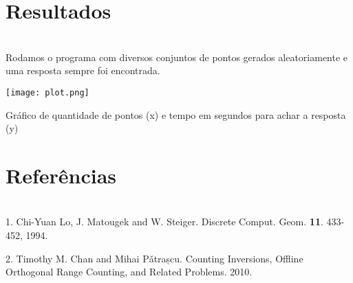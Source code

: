 \documentclass{article}
\begin{document}
\section{Resultados}\\

Rodamos o programa com diversos conjuntos de pontos gerados aleatoriamente e uma resposta sempre foi encontrada.

\texttt{[image: plot.png]}
\caption{Gráfico de quantidade de pontos (x) e tempo em segundos para achar a resposta (y)}

\section{Referências}\\

1. Chi-Yuan Lo, J. Matougek and W. Steiger. Discrete Comput. Geom. \textbf{11}. 433-452, 1994.

2. Timothy M. Chan and Mihai Pǎtrașcu. Counting Inversions, Offline Orthogonal Range Counting, and Related Problems. 2010.
\end{document}
